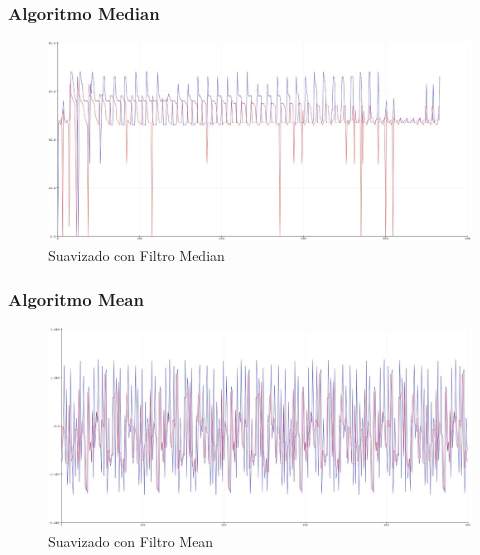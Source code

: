\documentclass[10pt,a4paper]{article}
\begin{document}
\subsubsection{Algoritmo Median}
\begin{figure}[H]
\centering
\includegraphics[scale=0.35]{median}
\caption{Suavizado con Filtro Median}
\end{figure}

\subsubsection{Algoritmo Mean}
\begin{figure}[H]
\centering
\includegraphics[scale=0.35]{mean}
\caption{Suavizado con Filtro Mean}
\end{figure}
\end{document}
